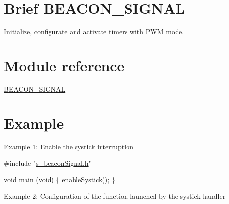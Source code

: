 \hypertarget{_s_t_m32__s_i_g_n_a_l__e_m_i_s_s_i_o_n_BEACON_SIGNAL_intro}{}\section{Brief B\+E\+A\+C\+O\+N\+\_\+\+S\+I\+G\+N\+A\+L}\label{_s_t_m32__s_i_g_n_a_l__e_m_i_s_s_i_o_n_BEACON_SIGNAL_intro}
Initialize, configurate and activate timers with P\+W\+M mode.\hypertarget{_s_t_m32__s_i_g_n_a_l__e_m_i_s_s_i_o_n_BEACON_SIGNAL_reference}{}\section{Module reference}\label{_s_t_m32__s_i_g_n_a_l__e_m_i_s_s_i_o_n_BEACON_SIGNAL_reference}

\begin{DoxyItemize}
\item \hyperlink{group__beacon_signal___module}{B\+E\+A\+C\+O\+N\+\_\+\+S\+I\+G\+N\+A\+L}
\end{DoxyItemize}\hypertarget{_s_t_m32__s_i_g_n_a_l__e_m_i_s_s_i_o_n_BEACON_SIGNAL_exemples}{}\section{Example}\label{_s_t_m32__s_i_g_n_a_l__e_m_i_s_s_i_o_n_BEACON_SIGNAL_exemples}
Example 1\+: Enable the systick interruption


\begin{DoxyCode}
\textcolor{preprocessor}{#include "\hyperlink{s__beacon_signal_8h}{s\_beaconSignal.h}"}

\textcolor{keywordtype}{void} main (\textcolor{keywordtype}{void})
\{
 \hyperlink{group__beacon_signal___function_ga90346dc49f0a8f6eeaaab8a26f3a22b5}{enableSystick}();
\}
\end{DoxyCode}


Example 2\+: Configuration of the function launched by the systick handler


